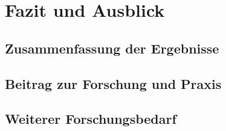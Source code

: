 \chapter{Fazit und Ausblick}
\label{ch:conclusion}

\section{Zusammenfassung der Ergebnisse}
\label{sec:summary}

\section{Beitrag zur Forschung und Praxis}
\label{sec:contribution}

\section{Weiterer Forschungsbedarf}
\label{sec:further research}